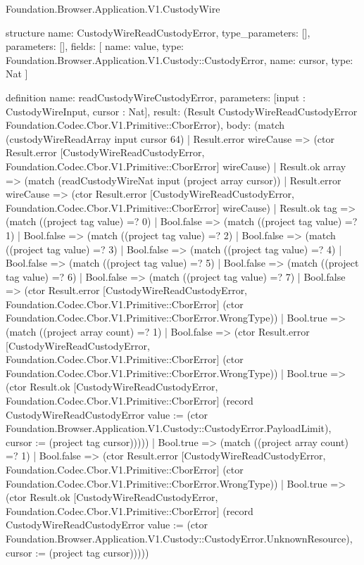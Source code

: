\begin{lexlean}{Foundation.Browser.Application.V1.CustodyWire}
\begin{semanticmodule}
structure{
  name: CustodyWireReadCustodyError,
  type_parameters: [],
  parameters: [],
  fields: [
    {name: value, type: Foundation.Browser.Application.V1.Custody::CustodyError},
    {name: cursor, type: Nat}
  ]
}

definition{
  name: readCustodyWireCustodyError,
  parameters: [input : CustodyWireInput, cursor : Nat],
  result: (Result CustodyWireReadCustodyError Foundation.Codec.Cbor.V1.Primitive::CborError),
  body: (match (custodyWireReadArray input cursor 64)
    | Result.error wireCause => (ctor Result.error [CustodyWireReadCustodyError, Foundation.Codec.Cbor.V1.Primitive::CborError] wireCause)
    | Result.ok array => (match (readCustodyWireNat input (project array cursor))
      | Result.error wireCause => (ctor Result.error [CustodyWireReadCustodyError, Foundation.Codec.Cbor.V1.Primitive::CborError] wireCause)
      | Result.ok tag => (match ((project tag value) =? 0)
        | Bool.false => (match ((project tag value) =? 1)
          | Bool.false => (match ((project tag value) =? 2)
            | Bool.false => (match ((project tag value) =? 3)
              | Bool.false => (match ((project tag value) =? 4)
                | Bool.false => (match ((project tag value) =? 5)
                  | Bool.false => (match ((project tag value) =? 6)
                    | Bool.false => (match ((project tag value) =? 7)
                      | Bool.false => (ctor Result.error [CustodyWireReadCustodyError, Foundation.Codec.Cbor.V1.Primitive::CborError] (ctor Foundation.Codec.Cbor.V1.Primitive::CborError.WrongType))
                      | Bool.true => (match ((project array count) =? 1)
                        | Bool.false => (ctor Result.error [CustodyWireReadCustodyError, Foundation.Codec.Cbor.V1.Primitive::CborError] (ctor Foundation.Codec.Cbor.V1.Primitive::CborError.WrongType))
                        | Bool.true => (ctor Result.ok [CustodyWireReadCustodyError, Foundation.Codec.Cbor.V1.Primitive::CborError] (record CustodyWireReadCustodyError {value := (ctor Foundation.Browser.Application.V1.Custody::CustodyError.PayloadLimit), cursor := (project tag cursor)}))))
                    | Bool.true => (match ((project array count) =? 1)
                      | Bool.false => (ctor Result.error [CustodyWireReadCustodyError, Foundation.Codec.Cbor.V1.Primitive::CborError] (ctor Foundation.Codec.Cbor.V1.Primitive::CborError.WrongType))
                      | Bool.true => (ctor Result.ok [CustodyWireReadCustodyError, Foundation.Codec.Cbor.V1.Primitive::CborError] (record CustodyWireReadCustodyError {value := (ctor Foundation.Browser.Application.V1.Custody::CustodyError.UnknownResource), cursor := (project tag cursor)}))))
}
\end{semanticmodule}
\end{lexlean}
